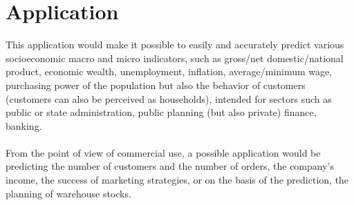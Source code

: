     \section{Application}
    This application would make it possible to easily and accurately predict various socioeconomic macro and micro indicators, such as gross/net domestic/national product, economic wealth, unemployment, inflation, average/minimum wage, purchasing power of the population but also the behavior of customers (customers can also be perceived as households), intended for sectors such as public or state administration, public planning (but also private) finance, banking.\\
    \\
    From the point of view of commercial use, a possible application would be predicting the number of customers and the number of orders, the company's income, the success of marketing strategies, or on the basis of the prediction, the planning of warehouse stocks.
